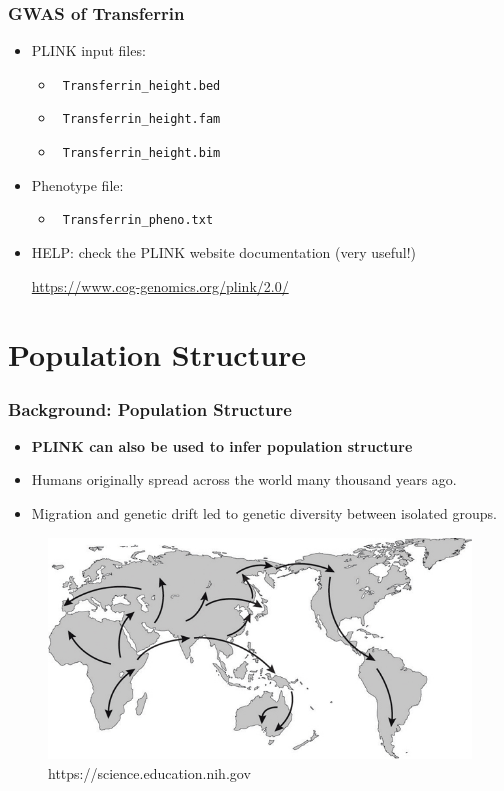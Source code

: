 \documentclass{beamer}
\begin{document}
\begin{frame}[fragile]
\frametitle{\bf GWAS of Transferrin}
\begin{itemize}
\item PLINK input files:
\begin{itemize}
\item \verb+ Transferrin_height.bed+
\item \verb+ Transferrin_height.fam+
\item \verb+ Transferrin_height.bim+
\end{itemize}
\item Phenotype file:
\begin{itemize}
	\item \verb+ Transferrin_pheno.txt+
\end{itemize}
\item HELP: check the PLINK website documentation (very useful!)

\vspace{.5em}
\centering\url{https://www.cog-genomics.org/plink/2.0/}
\end{itemize}
\end{frame}


\section{Population Structure}

\begin{frame}
	\frametitle{Background:  Population Structure}
	\begin{itemize}
		\item \textbf{PLINK can also be used to infer population structure}
		\item Humans originally spread across the world many thousand years ago.
		\item Migration and genetic drift led to genetic diversity between isolated groups.
	\end{itemize}
	\begin{figure}
		\centering
		\includegraphics[scale=.40]{Figures/outofafrica.jpg}
		\caption{\scriptsize https://science.education.nih.gov}
	\end{figure}
	
\end{frame}
\end{document}
